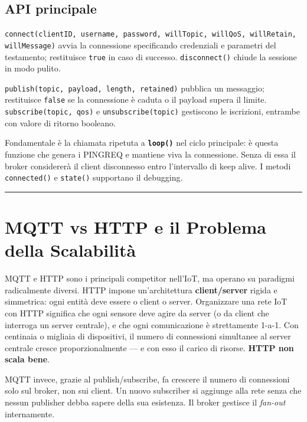 \documentclass[
  italian,
  openany]{book}
\begin{document}
\subsection{API principale}\label{api-principale}

\texttt{connect(clientID,\ username,\ password,\ willTopic,\ willQoS,\ willRetain,\ willMessage)}
avvia la connessione specificando credenziali e parametri del
testamento; restituisce \texttt{true} in caso di successo.
\texttt{disconnect()} chiude la sessione in modo pulito.

\texttt{publish(topic,\ payload,\ length,\ retained)} pubblica un
messaggio; restituisce \texttt{false} se la connessione è caduta o il
payload supera il limite. \texttt{subscribe(topic,\ qos)} e
\texttt{unsubscribe(topic)} gestiscono le iscrizioni, entrambe con
valore di ritorno booleano.

Fondamentale è la chiamata ripetuta a \textbf{\texttt{loop()}} nel ciclo
principale: è questa funzione che genera i PINGREQ e mantiene viva la
connessione. Senza di essa il broker considererà il client disconnesso
entro l'intervallo di keep alive. I metodi \texttt{connected()} e
\texttt{state()} supportano il debugging.

\begin{center}\rule{0.5\linewidth}{0.5pt}\end{center}

\section{MQTT vs HTTP e il Problema della
Scalabilità}\label{mqtt-vs-http-e-il-problema-della-scalabilituxe0}

MQTT e HTTP sono i principali competitor nell'IoT, ma operano su
paradigmi radicalmente diversi. HTTP impone un'architettura
\textbf{client/server} rigida e simmetrica: ogni entità deve essere o
client o server. Organizzare una rete IoT con HTTP significa che ogni
sensore deve agire da server (o da client che interroga un server
centrale), e che ogni comunicazione è strettamente 1-a-1. Con centinaia
o migliaia di dispositivi, il numero di connessioni simultanee al server
centrale cresce proporzionalmente --- e con esso il carico di risorse.
\textbf{HTTP non scala bene}.

MQTT invece, grazie al publish/subscribe, fa crescere il numero di
connessioni solo sul broker, non sui client. Un nuovo subscriber si
aggiunge alla rete senza che nessun publisher debba sapere della sua
esistenza. Il broker gestisce il \emph{fan-out} internamente.
\end{document}
